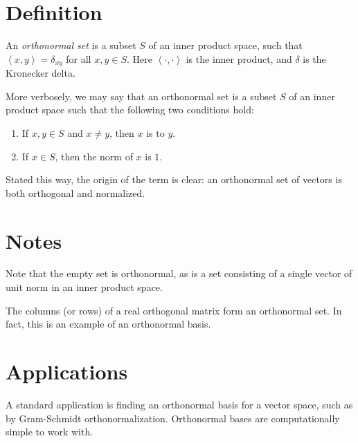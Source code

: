 \documentclass[12pt]{article}
\def\ip#1{{\left\langle #1\right\rangle}}
\begin{document}

\section*{Definition}

An \emph{orthonormal set} is a subset $S$ of an inner product space,
such that $\ip{x,y}=\delta_{xy}$ for all $x,y\in S$.
Here $\ip{\cdot,\cdot}$ is the inner product,
and $\delta$ is the Kronecker delta.

More verbosely, we may say that an orthonormal set
is a subset $S$ of an inner product space
such that the following two conditions hold:
\begin{enumerate}
\item If $x,y \in S$ and $x\ne y$, then $x$ is  to $y$.
\item If $x \in S$, then the norm of $x$ is $1$.
\end{enumerate}
Stated this way, the origin of the term is clear:
an orthonormal set of vectors is both orthogonal and normalized.

\section*{Notes}

Note that the empty set is orthonormal,
as is a set consisting of a single vector of unit norm
in an inner product space.

The columns (or rows) of a real orthogonal matrix form an orthonormal set.
In fact, this is an example of an orthonormal basis.

\section*{Applications}

A standard application is finding an orthonormal basis for a vector space,
such as by Gram-Schmidt orthonormalization.
Orthonormal bases are computationally simple to work with.

\end{document}
